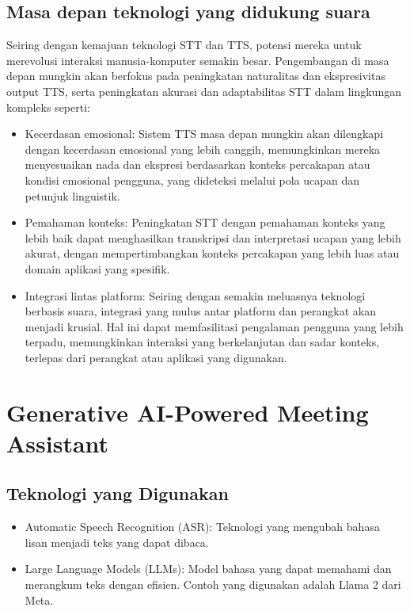 \documentclass{article}
\begin{document}
\subsection{Masa depan teknologi yang didukung suara}
Seiring dengan kemajuan teknologi STT dan TTS, potensi mereka untuk merevolusi interaksi manusia-komputer semakin besar. Pengembangan di masa depan mungkin akan berfokus pada peningkatan naturalitas dan ekspresivitas output TTS, serta peningkatan akurasi dan adaptabilitas STT dalam lingkungan kompleks seperti:
\begin{itemize}
    \item Kecerdasan emosional: Sistem TTS masa depan mungkin akan dilengkapi dengan kecerdasan emosional yang lebih canggih, memungkinkan mereka menyesuaikan nada dan ekspresi berdasarkan konteks percakapan atau kondisi emosional pengguna, yang dideteksi melalui pola ucapan dan petunjuk linguistik.
    \item Pemahaman konteks: Peningkatan STT dengan pemahaman konteks yang lebih baik dapat menghasilkan transkripsi dan interpretasi ucapan yang lebih akurat, dengan mempertimbangkan konteks percakapan yang lebih luas atau domain aplikasi yang spesifik.
    \item Integrasi lintas platform: Seiring dengan semakin meluasnya teknologi berbasis suara, integrasi yang mulus antar platform dan perangkat akan menjadi krusial. Hal ini dapat memfasilitasi pengalaman pengguna yang lebih terpadu, memungkinkan interaksi yang berkelanjutan dan sadar konteks, terlepas dari perangkat atau aplikasi yang digunakan.
\end{itemize}

\newpage

\section{Generative AI-Powered Meeting Assistant}
\subsection{Teknologi yang Digunakan}
\begin{itemize}
    \item Automatic Speech Recognition (ASR): Teknologi yang mengubah bahasa lisan menjadi teks yang dapat dibaca.
    \item Large Language Models (LLMs): Model bahasa yang dapat memahami dan merangkum teks dengan efisien. Contoh yang digunakan adalah Llama 2 dari Meta.
\end{itemize}
\end{document}
